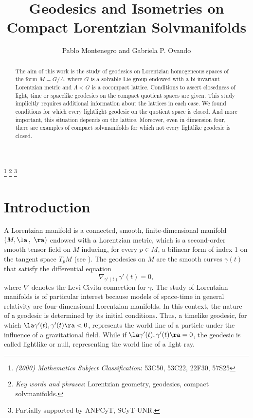 \documentclass[12pt]{amsart}
\theoremstyle{plain}
\theoremstyle{definition}
\theoremstyle{remark}
\begin{document}
\title[Geodesics and Isometries on Compact Lorentzian Solvmanifolds]{Geodesics and Isometries on Compact Lorentzian Solvmanifolds}

\begin{abstract}
    The aim of this work is the study of geodesics on Lorentzian homogeneous spaces of the form $M=G/\Lambda$, where $G$ is a solvable Lie group endowed with a bi-invariant Lorentzian metric and $\Lambda < G$ is a cocompact lattice. Conditions to assert closedness of light, time or spacelike geodesics on the compact quotient spaces are given. This study implicitly requires additional information about the lattices in each case. We found conditions for which every lightlight geodesic on the quotient space is closed. And more important, this situation depends on the lattice. Moreover, even in dimension four, there are examples of compact solvmanifolds for which not every lightlike geodesic is closed.
\end{abstract}

\author{Pablo Montenegro and Gabriela P. Ovando}

\let\today\relax
\thanks{{\it (2000) Mathematics Subject Classification}: 53C50, 53C22, 22F30, 57S25}
\thanks{{\it Key words and phrases}: Lorentzian geometry, geodesics, compact solvmanifolds.}
\thanks{Partially supported by ANPCyT, SCyT-UNR.}

\address{Departamento de Matemática, ECEN - FCEIA, Universidad Nacional de Rosario, Pellegrini 250, 2000 Rosario, Santa Fe, Argentina.}

\maketitle

\section{Introduction}
A Lorentzian manifold is a connected, smooth, finite-dimensional manifold $(M, \la \, , \ \ra)$ endowed with a Lorentzian metric, which is a second-order smooth tensor field on $M$ inducing, for every $p\in M$, a bilinear form of index 1 on the tangent space $T_pM$ (see \cite{ON}). The geodesics on $M$ are the smooth curves $\gamma(t)$ that satisfy the differential equation
\begin{equation*}
\nabla_{\gamma'(t)}\gamma'(t)=0,
\end{equation*}
where $\nabla$ denotes the Levi-Civita connection for $\gamma$. The study of Lorentzian manifolds is of particular interest because models of space-time in general relativity are four-dimensional Lorentzian manifolds. In this context, the nature of a geodesic is determined by its initial conditions. Thus, a timelike geodesic, for which $\la \gamma'(t), \gamma'(t)\ra < 0$, represents the world line of a particle under the influence of a gravitational field. While if $\la \gamma'(t), \gamma'(t)\ra = 0$, the geodesic is called lightlike or null, representing the world line of a light ray.
\end{document}
